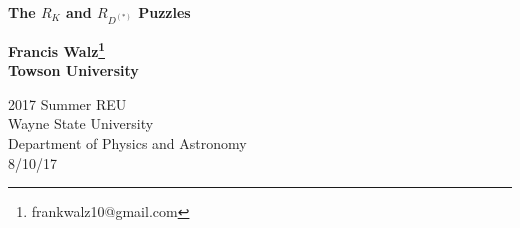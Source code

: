 \documentclass[12pt]{article}
\begin{document}
\begin{titlepage}
    \begin{center}
        \vspace*{1cm}
        
        \Huge
        \textbf{The $R_K$ and $R_{D^{(*)}}$ Puzzles}
        
        \vspace{0.5cm}
        \large
        
        \vspace{1.5cm}
        
        \textbf{Francis Walz\footnote{frankwalz10@gmail.com}\\ Towson University}
        
        \vfill
        
        \vspace{0.8cm}
        
        \Large
        2017 Summer REU\\
        Wayne State University\\
        Department of Physics and Astronomy\\
        8/10/17
        
    \end{center}
\end{titlepage}
\tableofcontents
\newpage
\end{document}
